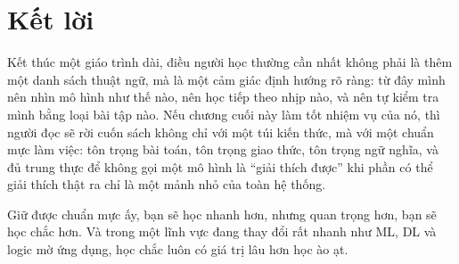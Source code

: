 \section{Kết lời}

Kết thúc một giáo trình dài, điều người học thường cần nhất không phải là thêm một danh sách thuật ngữ, mà là một cảm giác định hướng rõ ràng: từ đây mình nên nhìn mô hình như thế nào, nên học tiếp theo nhịp nào, và nên tự kiểm tra mình bằng loại bài tập nào. Nếu chương cuối này làm tốt nhiệm vụ của nó, thì người đọc sẽ rời cuốn sách không chỉ với một túi kiến thức, mà với một chuẩn mực làm việc: tôn trọng bài toán, tôn trọng giao thức, tôn trọng ngữ nghĩa, và đủ trung thực để không gọi một mô hình là ``giải thích được'' khi phần có thể giải thích thật ra chỉ là một mảnh nhỏ của toàn hệ thống.

Giữ được chuẩn mực ấy, bạn sẽ học nhanh hơn, nhưng quan trọng hơn, bạn sẽ học chắc hơn. Và trong một lĩnh vực đang thay đổi rất nhanh như ML, DL và logic mờ ứng dụng, học chắc luôn có giá trị lâu hơn học ào ạt.
